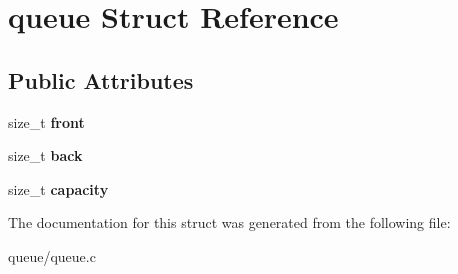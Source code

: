 \hypertarget{structqueue}{}\section{queue Struct Reference}
\label{structqueue}
\subsection*{Public Attributes}
\begin{DoxyCompactItemize}
\item 
\mbox{\label{structqueue_a4fab87a90c34561a806c1837eb4774c6}} 
size\+\_\+t {\bfseries front}
\item 
\mbox{\label{structqueue_aa048ed558ab5cf8675e22d660964c8c0}} 
size\+\_\+t {\bfseries back}
\item 
\mbox{\label{structqueue_a0f5a6339a2db306f63d6b9f564eb4a6c}} 
size\+\_\+t {\bfseries capacity}
\end{DoxyCompactItemize}


The documentation for this struct was generated from the following file\+:\begin{DoxyCompactItemize}
\item 
queue/queue.\+c\end{DoxyCompactItemize}
